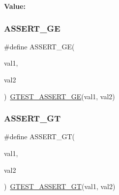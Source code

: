 {\bfseries Value\+:}
\begin{DoxyCode}{0}

\end{DoxyCode}
\mbox{\label{googletest-master_2googletest_2include_2gtest_2gtest_8h_af4ff5dc71479fcb374b6bc2ed195bcc4}} 
\subsubsection{\texorpdfstring{ASSERT\_GE}{ASSERT\_GE}}
{\footnotesize\ttfamily \#define A\+S\+S\+E\+R\+T\+\_\+\+GE(\begin{DoxyParamCaption}\item[{}]{val1,  }\item[{}]{val2 }\end{DoxyParamCaption})~\mbox{\hyperlink{_obj__test_2lib_2googletest-release-1_88_81_2googletest_2include_2gtest_2gtest_8h_a55373d99c079ff1b894e2eb5bcd15c5a}{G\+T\+E\+S\+T\+\_\+\+A\+S\+S\+E\+R\+T\+\_\+\+GE}}(val1, val2)}

\mbox{\label{googletest-master_2googletest_2include_2gtest_2gtest_8h_a16a882d4eafc9f8643867aea40879140}} 
\subsubsection{\texorpdfstring{ASSERT\_GT}{ASSERT\_GT}}
{\footnotesize\ttfamily \#define A\+S\+S\+E\+R\+T\+\_\+\+GT(\begin{DoxyParamCaption}\item[{}]{val1,  }\item[{}]{val2 }\end{DoxyParamCaption})~\mbox{\hyperlink{_obj__test_2lib_2googletest-release-1_88_81_2googletest_2include_2gtest_2gtest_8h_a088b9056fd1c1f316b41c22f64deb33a}{G\+T\+E\+S\+T\+\_\+\+A\+S\+S\+E\+R\+T\+\_\+\+GT}}(val1, val2)}

\mbox{\label{googletest-master_2googletest_2include_2gtest_2gtest_8h_a775643748feff0b490aae651d041e971}} 
